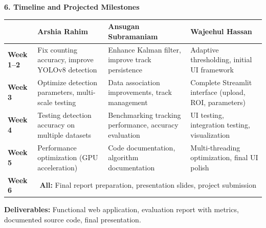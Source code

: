 \documentclass[8pt,a4paper]{article}
\begin{document}
\vspace{0.1cm}
\noindent\textbf{6. Timeline and Projected Milestones}

\vspace{0.15cm}
\begin{table}[h]
\centering
\footnotesize
\begin{tabular}{|p{1.5cm}|p{3.3cm}|p{3.3cm}|p{3.3cm}|}
\hline
 & \textbf{Arshia Rahim} & \textbf{Ansugan Subramaniam} & \textbf{Wajeehul Hassan} \\
\hline
\textbf{Week 1--2} & Fix counting accuracy, improve YOLOv8 detection & Enhance Kalman filter, improve track persistence & Adaptive thresholding, initial UI framework \\
\hline
\textbf{Week 3} & Optimize detection parameters, multi-scale testing & Data association improvements, track management & Complete Streamlit interface (upload, ROI, parameters) \\
\hline
\textbf{Week 4} & Testing detection accuracy on multiple datasets & Benchmarking tracking performance, accuracy evaluation & UI testing, integration testing, visualization \\
\hline
\textbf{Week 5} & Performance optimization (GPU acceleration) & Code documentation, algorithm documentation & Multi-threading optimization, final UI polish \\
\hline
\textbf{Week 6} & \multicolumn{3}{|c|}{\textbf{All:} Final report preparation, presentation slides, project submission} \\
\hline
\end{tabular}
\end{table}

\vspace{0.15cm}
\noindent\textbf{Deliverables:} Functional web application, evaluation report with metrics, documented source code, final presentation.
\end{document}
